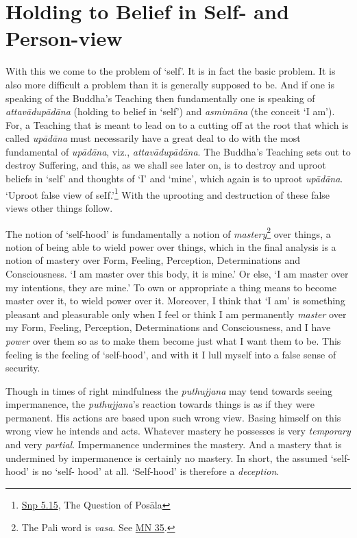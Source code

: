 \chapter{Holding to Belief in Self- and Person-view}

With this we come to the problem of `self'. It is in fact the basic problem. It is also more difficult a problem than it is generally supposed to be. And if one is speaking of the Buddha's Teaching then fundamentally one is speaking of \textit{attavādupādāna} (holding to belief in `self') and \textit{asmimāna} (the conceit `I am'). For, a Teaching that is meant to lead on to a cutting off at the root that which is called \textit{upādāna} must necessarily have a great deal to do with the most fundamental of \textit{upādāna}, viz., \textit{attavādupādāna}. The Buddha's Teaching sets out to destroy Suffering, and this, as we shall see later on, is to destroy and uproot beliefs in `self' and thoughts of `I' and `mine', which again is to uproot \textit{upādāna}. `Uproot false view of seIf.'\footnote{\href{https://suttacentral.net/snp5.15/en/sujato}{Snp 5.15}, The Question of Posāla} With the uprooting and destruction of these false views other things follow.

The notion of `self-hood' is fundamentally a notion of \emph{mastery}\footnote{The Pali word is \textit{vasa}. See \href{https://suttacentral.net/mn35/en/sujato}{MN 35}.} over things, a notion of being able to wield power over things, which in the final analysis is a notion of mastery over Form, Feeling, Perception, Determinations and Consciousness. `I am master over this body, it is mine.' Or else, `I am master over my intentions, they are mine.' To own or appropriate a thing means to become master over it, to wield power over it. Moreover, I think that `I am' is something pleasant and pleasurable only when I feel or think I am permanently \emph{master} over my Form, Feeling, Perception, Determinations and Consciousness, and I have \emph{power} over them so as to make them become just what I want them to be. This feeling is the feeling of `self-hood', and with it I lull myself into a false sense of security.

Though in times of right mindfulness the \textit{puthujjana} may tend towards seeing impermanence, the \textit{puthujjana}'s reaction towards things is as if they were permanent. His actions are based upon such wrong view. Basing himself on this wrong view he intends and acts. Whatever mastery he possesses is very \emph{temporary} and very \emph{partial}. Impermanence undermines the mastery. And a mastery that is undermined by impermanence is certainly no mastery. In short, the assumed `self-hood' is no `self- hood' at all. `Self-hood' is therefore a \emph{deception}.

